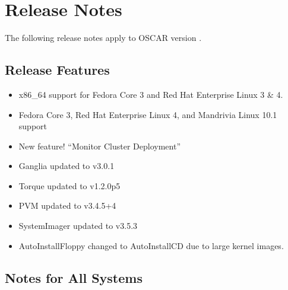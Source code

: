 %
%
%
%

\section{Release Notes}
\label{sec:release-notes}

The following release notes apply to OSCAR version \oscarversion.
\subsection{Release Features}
\label{subsec:release-features}

\begin{itemize}

\item x86\_64 support for Fedora Core 3 and Red Hat Enterprise Linux 3 \& 4.
\item Fedora Core 3, Red Hat Enterprise Linux 4, and 
      Mandrivia Linux 10.1 support
\item New feature! ``Monitor Cluster Deployment''
\item Ganglia updated to v3.0.1
\item Torque updated to v1.2.0p5
\item PVM updated to v3.4.5+4
\item SystemImager updated to v3.5.3
\item AutoInstallFloppy changed to AutoInstallCD due to large kernel images.

\end{itemize}

\subsection{Notes for All Systems}
\label{subsec:release-notes}

